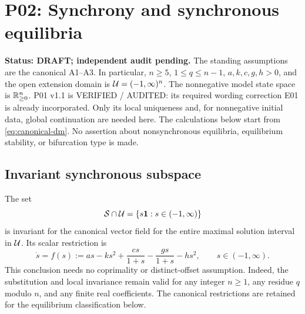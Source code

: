 
\section{P02: Synchrony and synchronous equilibria}
\label{sec:P02}

\noindent\textbf{Status: DRAFT; independent audit pending.}
The standing assumptions are the canonical A1--A3. In particular,
$n\ge5$, $1\le q\le n-1$, $a,k,c,g,h>0$, and the open extension
domain is $\mathcal{U}=(-1,\infty)^n$. The nonnegative model state space
is $\mathbb{R}_{\geq 0}^{n}$. P01 v1.1 is VERIFIED / AUDITED: its required wording
correction E01 is already incorporated. Only its local uniqueness
and, for nonnegative initial data, global continuation are needed here.
The calculations below start from \eqref{eq:canonical-dm}.
No assertion about nonsynchronous equilibria, equilibrium stability,
or bifurcation type is made.

\subsection{Invariant synchronous subspace}
\label{slot:P02-1}

\begin{proposition}
\label{prop:P02-invariance}
The set
\[
 \mathcal{S}\cap\mathcal{U}=\{s\mathbf{1}:s\in(-1,\infty)\}
\]
is invariant for the canonical vector field for the entire maximal
solution interval in $\mathcal{U}$. Its scalar restriction is
\begin{equation}
\label{eq:P02-scalar-original}
 \dot s=f(s):=as-ks^2+\frac{cs}{1+s}
                     -\frac{gs}{1+s}-hs^2,
 \qquad s\in(-1,\infty).
\end{equation}
This conclusion needs no coprimality or distinct-offset assumption.
Indeed, the substitution and local invariance remain valid for any
integer $n\ge1$, any residue $q$ modulo $n$, and any finite real
coefficients. The canonical restrictions are retained for the
equilibrium classification below.
\end{proposition}

